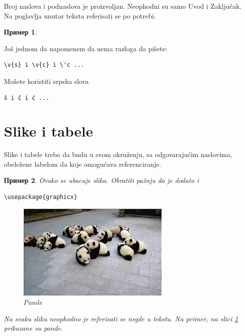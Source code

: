 \documentclass[a4paper]{article}
\newtheorem{primer}{Пример}[section] %
\begin{document}
Broj naslova i podnaslova je proizvoljan. Neophodni su samo Uvod i Zaključak. Na poglavlja unutar teksta referisati se po potrebi. 
\begin{primer}
\end{primer}

Još jednom da napomenem da nema razloga da pišete:
\begin{verbatim}
\v{s} i \v{c} i \'c ...
\end{verbatim}
Možete koristiti srpska slova
\begin{verbatim}
š i č i ć ... 
\end{verbatim}



\section{Slike i tabele}
\label{slike_i_tabele}

Slike i tabele treba da budu u svom okruženju, sa odgovarajućim naslovima, obeležene labelom da koje omogućava referenciranje. 

\begin{primer} Ovako se ubacuje slika. Obratiti pažnju da je dodato i 
\begin{verbatim}
\usepackage{graphicx}
\end{verbatim}

\begin{figure}[h!]
\begin{center}
\includegraphics[scale=0.75]{panda.jpg}
\end{center}
\caption{Pande}
\label{fig:pande}
\end{figure}

Na svaku sliku neophodno je referisati se negde u tekstu. Na primer, na slici \ref{fig:pande} prikazane su pande. 
\end{primer}
\end{document}
